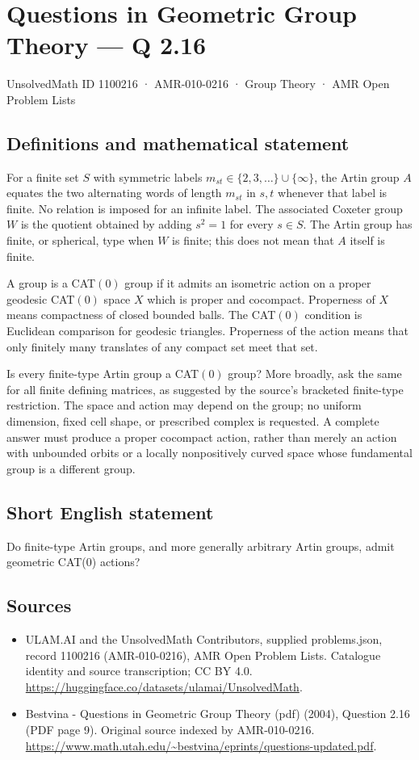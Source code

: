 \documentclass[11pt,a4paper]{article}
\begin{document}
\section*{Questions in Geometric Group Theory — Q 2.16}\label{1100216}
{\small UnsolvedMath ID 1100216 · AMR-010-0216 · Group Theory · AMR Open Problem Lists}
\subsection{Definitions and mathematical statement}
For a finite set $S$ with symmetric labels $m_{st}\in\{2,3,\ldots\}\cup\{\infty\}$, the Artin group $A$ equates the two alternating words of length $m_{st}$ in $s,t$ whenever that label is finite. No relation is imposed for an infinite label. The associated Coxeter group $W$ is the quotient obtained by adding $s^2=1$ for every $s\in S$. The Artin group has finite, or spherical, type when $W$ is finite; this does not mean that $A$ itself is finite.

A group is a CAT$(0)$ group if it admits an isometric action on a proper geodesic CAT$(0)$ space $X$ which is proper and cocompact. Properness of $X$ means compactness of closed bounded balls. The CAT$(0)$ condition is Euclidean comparison for geodesic triangles. Properness of the action means that only finitely many translates of any compact set meet that set.

Is every finite-type Artin group a CAT$(0)$ group? More broadly, ask the same for all finite defining matrices, as suggested by the source's bracketed finite-type restriction. The space and action may depend on the group; no uniform dimension, fixed cell shape, or prescribed complex is requested. A complete answer must produce a proper cocompact action, rather than merely an action with unbounded orbits or a locally nonpositively curved space whose fundamental group is a different group.
\subsection{Short English statement}
Do finite-type Artin groups, and more generally arbitrary Artin groups, admit geometric CAT(0) actions?
\subsection{Sources}
\begin{itemize}
\item[S1] ULAM.AI and the UnsolvedMath Contributors, supplied problems.json, record 1100216 (AMR-010-0216), AMR Open Problem Lists. Catalogue identity and source transcription; CC BY 4.0.
\url{https://huggingface.co/datasets/ulamai/UnsolvedMath}.
\item[S2] Bestvina - Questions in Geometric Group Theory (pdf) (2004), Question 2.16 (PDF page 9). Original source indexed by AMR-010-0216.
\url{https://www.math.utah.edu/~bestvina/eprints/questions-updated.pdf}.
\end{itemize}
\end{document}

